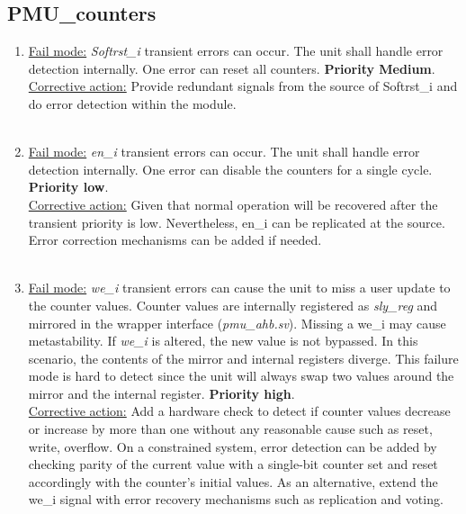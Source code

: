 \subsection{PMU\_counters}
\begin{enumerate}
\item \underline{Fail mode:} \textit{Softrst\_i} transient errors can occur. The unit shall handle error detection internally. One error can reset all counters. \textbf{Priority Medium}.\\
\underline{Corrective action:} Provide redundant signals from the source of Softrst\_i and do error detection within the module.\\
\\
\item \underline{Fail mode:} \textit{en\_i} transient errors can occur. The unit shall handle error detection internally. One error can disable the counters for a single cycle. \textbf{Priority low}.\\
\underline{Corrective action:} 
Given that normal operation will be recovered after the transient priority is low. Nevertheless, en\_i can be replicated at the source. Error correction mechanisms can be added if needed. \\
\\
\item \underline{Fail mode:} \textit{we\_i }transient errors can cause the unit to miss a user update to the counter values. Counter values are internally registered as \textit{sly\_reg} and mirrored in the wrapper interface (\textit{pmu\_ahb.sv}). Missing a we\_i may cause metastability. If \textit{we\_i} is altered, the new value is not bypassed. In this scenario, the contents of the mirror and internal registers diverge. This failure mode is hard to detect since the unit will always swap two values around the mirror and the internal register. \textbf{Priority high}.\\
\underline{Corrective action:}  Add a hardware check to detect if counter values decrease or increase by more than one without any reasonable cause such as reset, write, overflow. On a constrained system, error detection can be added by checking parity of the current value with a single-bit counter set and reset accordingly with the counter's initial values. As an alternative, extend the we\_i signal with error recovery mechanisms such as replication and voting.\\
\\
\end{enumerate}
